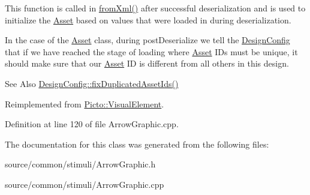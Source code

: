 This function is called in \hyperlink{class_picto_1_1_asset_a8bed4da09ecb1c07ce0dab313a9aba67}{from\-Xml()} after successful deserialization and is used to initialize the \hyperlink{class_picto_1_1_asset}{Asset} based on values that were loaded in during deserialization. 

In the case of the \hyperlink{class_picto_1_1_asset}{Asset} class, during post\-Deserialize we tell the \hyperlink{class_picto_1_1_design_config}{Design\-Config} that if we have reached the stage of loading where \hyperlink{class_picto_1_1_asset}{Asset} I\-Ds must be unique, it should make sure that our \hyperlink{class_picto_1_1_asset}{Asset} I\-D is different from all others in this design. \begin{DoxySeeAlso}{See Also}
\hyperlink{class_picto_1_1_design_config_ab57e0738b97e4358ab09530cd6815fc0}{Design\-Config\-::fix\-Duplicated\-Asset\-Ids()} 
\end{DoxySeeAlso}


Reimplemented from \hyperlink{struct_picto_1_1_visual_element_a48c6087344d566cae7cd925443b571da}{Picto\-::\-Visual\-Element}.



Definition at line 120 of file Arrow\-Graphic.\-cpp.



The documentation for this class was generated from the following files\-:\begin{DoxyCompactItemize}
\item 
source/common/stimuli/Arrow\-Graphic.\-h\item 
source/common/stimuli/Arrow\-Graphic.\-cpp\end{DoxyCompactItemize}
